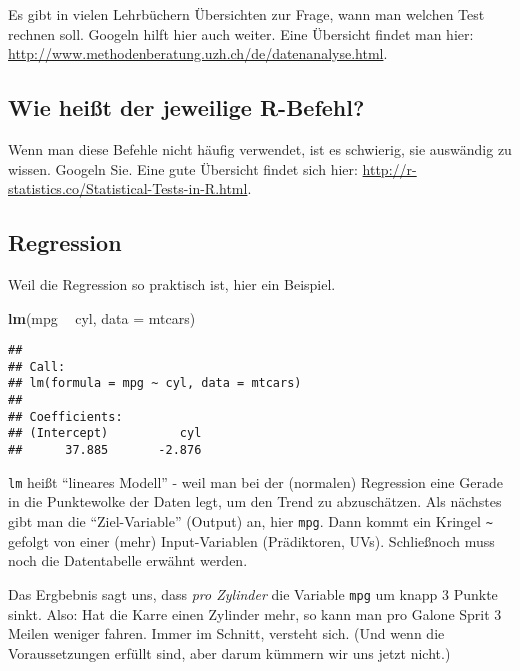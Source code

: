 \documentclass[]{article}
\newenvironment{Shaded}{\begin{snugshade}}{\end{snugshade}}
\newcommand{\DataTypeTok}[1]{\textcolor[rgb]{0.13,0.29,0.53}{#1}}
\newcommand{\KeywordTok}[1]{\textcolor[rgb]{0.13,0.29,0.53}{\textbf{#1}}}
\newcommand{\NormalTok}[1]{#1}
\newcommand{\OperatorTok}[1]{\textcolor[rgb]{0.81,0.36,0.00}{\textbf{#1}}}
\newcommand{\StringTok}[1]{\textcolor[rgb]{0.31,0.60,0.02}{#1}}
\begin{document}
Es gibt in vielen Lehrbüchern Übersichten zur Frage, wann man welchen
Test rechnen soll. Googeln hilft hier auch weiter. Eine Übersicht findet
man hier: \url{http://www.methodenberatung.uzh.ch/de/datenanalyse.html}.

\hypertarget{wie-heit-der-jeweilige-r-befehl}{%
\subsection{Wie heißt der jeweilige
R-Befehl?}\label{wie-heit-der-jeweilige-r-befehl}}

Wenn man diese Befehle nicht häufig verwendet, ist es schwierig, sie
auswändig zu wissen. Googeln Sie. Eine gute Übersicht findet sich hier:
\url{http://r-statistics.co/Statistical-Tests-in-R.html}.

\hypertarget{regression}{%
\subsection{Regression}\label{regression}}

Weil die Regression so praktisch ist, hier ein Beispiel.

\begin{Shaded}
\begin{Highlighting}[]
\KeywordTok{lm}\NormalTok{(mpg }\OperatorTok{~}\StringTok{ }\NormalTok{cyl, }\DataTypeTok{data =}\NormalTok{ mtcars)}
\end{Highlighting}
\end{Shaded}

\begin{verbatim}
## 
## Call:
## lm(formula = mpg ~ cyl, data = mtcars)
## 
## Coefficients:
## (Intercept)          cyl  
##      37.885       -2.876
\end{verbatim}

\texttt{lm} heißt ``lineares Modell'' - weil man bei der (normalen)
Regression eine Gerade in die Punktewolke der Daten legt, um den Trend
zu abzuschätzen. Als nächstes gibt man die ``Ziel-Variable'' (Output)
an, hier \texttt{mpg}. Dann kommt ein Kringel \texttt{\textasciitilde{}}
gefolgt von einer (mehr) Input-Variablen (Prädiktoren, UVs). Schließnoch
muss noch die Datentabelle erwähnt werden.

Das Ergbebnis sagt uns, dass \emph{pro Zylinder} die Variable
\texttt{mpg} um knapp 3 Punkte sinkt. Also: Hat die Karre einen Zylinder
mehr, so kann man pro Galone Sprit 3 Meilen weniger fahren. Immer im
Schnitt, versteht sich. (Und wenn die Voraussetzungen erfüllt sind, aber
darum kümmern wir uns jetzt nicht.)
\end{document}
